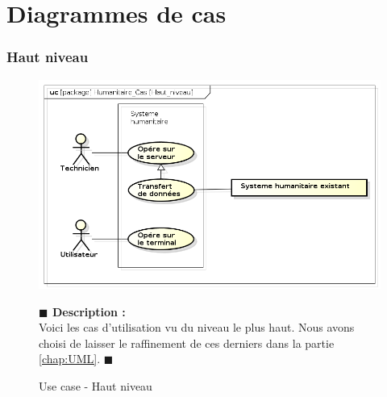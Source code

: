 \documentclass[11pt, titlepage]{report}
\newcommand{\debutDescription}{\noindent\textbf{\textcolor{DescriptionColor}{$\blacksquare$  Description : \\}}}
\newcommand{\finDescription}{\noindent\textcolor{DescriptionColor}{$\blacksquare$}}
\begin{document}
\section{Diagrammes de cas}
\subsubsection{Haut niveau}
\begin{figure}[h!]
\begin{center}
\includegraphics[scale=.4]{../images/diagrammes/sysml/use_case/haut_niveau.png}
\end{center}
\caption{Use case - Haut niveau}
\debutDescription
Voici les cas d'utilisation vu du niveau le plus haut. Nous avons choisi de laisser le raffinement de ces derniers dans la partie \ref{chap:UML}.
\finDescription
\end{figure}
\end{document}
